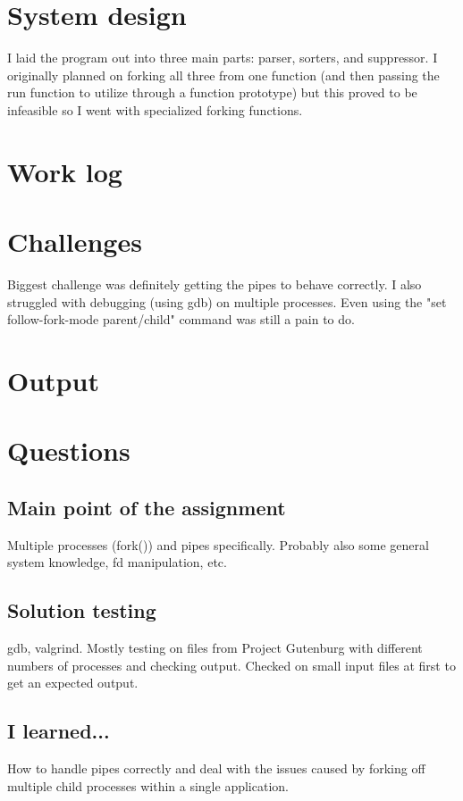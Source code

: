 \documentclass[letterpaper,10pt,titlepage]{article}
\begin{document}
\section{System design}
I laid the program out into three main parts: parser, sorters, and suppressor.
I originally planned on forking all three from one function (and then passing the
run function to utilize through a function prototype) but this proved to be
infeasible so I went with specialized forking functions.

\section{Work log}


\section{Challenges}
Biggest challenge was definitely getting the pipes to behave correctly. I also
struggled with debugging (using gdb) on multiple processes. Even using the
"set follow-fork-mode parent/child" command was still a pain to do.

\section{Output}

\section{Questions}
\subsection{Main point of the assignment}
Multiple processes (fork()) and pipes specifically. Probably also some general
system knowledge, fd manipulation, etc.

\subsection{Solution testing}
gdb, valgrind. Mostly testing on files from Project Gutenburg with different numbers
of processes and checking output. Checked on small input files at first to get an
expected output.

\subsection{I learned...}
How to handle pipes correctly and deal with the issues caused by forking off multiple
child processes within a single application.
\end{document}

